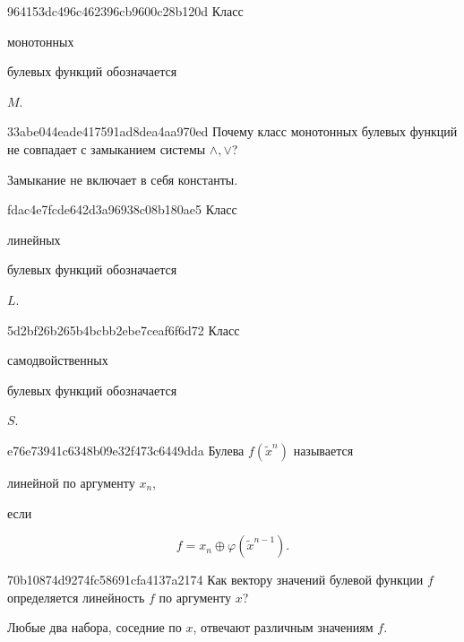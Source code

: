 \begin{note}{964153dc496c462396cb9600c28b120d}
    Класс \begin{icloze}{2}монотонных\end{icloze} булевых функций обозначается \begin{icloze}{1}\({ M }\).\end{icloze}
\end{note}

\begin{note}{33abe044eade417591ad8dea4aa970ed}
    Почему класс монотонных булевых функций не совпадает с замыканием системы \({ \land, \lor }\)?

    \begin{cloze}{1}
        Замыкание не включает в себя константы.
    \end{cloze}
\end{note}

\begin{note}{fdac4e7fcde642d3a96938c08b180ae5}
    Класс \begin{icloze}{2}линейных\end{icloze} булевых функций обозначается \begin{icloze}{1}\({ L }\).\end{icloze}
\end{note}

\begin{note}{5d2bf26b265b4bcbb2ebe7ceaf6f6d72}
    Класс \begin{icloze}{2}самодвойственных\end{icloze} булевых функций обозначается \begin{icloze}{1}\({ S }\).\end{icloze}
\end{note}

\begin{note}{e76e73941c6348b09e32f473c6449dda}
    Булева \({ f(\widetilde x^{n}) }\) называется \begin{icloze}{2}линейной по аргументу \({ x_n }\),\end{icloze} если
    \begin{icloze}{1}
        \[
            f = x_n \oplus \varphi(\widetilde x^{n-1}).
        \]
    \end{icloze}
\end{note}

\begin{note}{70b10874d9274fc58691cfa4137a2174}
    Как вектору значений булевой функции \({ f }\) определяется линейность \({ f }\) по аргументу \({ x }\)?

    \begin{cloze}{1}
        Любые два набора, соседние по \({ x }\), отвечают различным значениям \({ f }\).
    \end{cloze}
\end{note}

